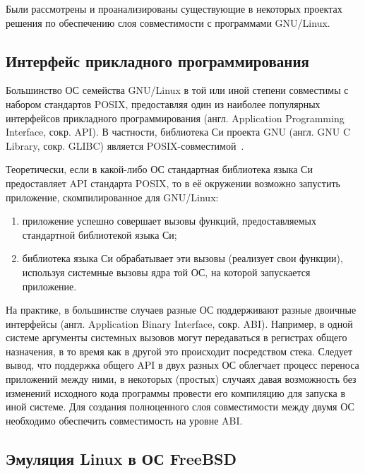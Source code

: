 
\label{sec:relatedworks}

Были рассмотрены и проанализированы существующие в некоторых проектах решения по обеспечению слоя совместимости с программами GNU/Linux.

\subsection{Интерфейс прикладного программирования}

Большинство ОС семейства GNU/Linux в той или иной степени совместимы с набором стандартов POSIX, предоставляя один из наиболее популярных интерфейсов прикладного программирования (англ. Application Programming Interface, сокр. API). В частности, библиотека Си проекта GNU (англ. GNU C Library, сокр. GLIBC) является POSIX-совместимой~\cite{glibc-man}.

Теоретически, если в какой-либо ОС стандартная библиотека языка Си предоставляет API стандарта POSIX, то в её окружении возможно запустить приложение, скомпилированное для GNU/Linux:
\begin{enumerate}
    \item приложение успешно совершает вызовы функций, предоставляемых стандартной библиотекой языка Си;
    \item библиотека языка Си обрабатывает эти вызовы (реализует свои функции), используя системные вызовы ядра той ОС, на которой запускается приложение.~\cite[с.~96]{book:linux-kernel-development}
\end{enumerate}

На практике, в большинстве случаев разные ОС поддерживают разные двоичные интерфейсы (англ. Application Binary Interface, сокр. ABI). Например, в одной системе аргументы системных вызовов могут передаваться в регистрах общего назначения, в то время как в другой это происходит посредством стека. Следует вывод, что поддержка общего API в двух разных ОС облегчает процесс переноса приложений между ними, в некоторых (простых) случаях давая возможность без изменений исходного кода программы провести его компиляцию для запуска в иной системе. Для создания полноценного слоя совместимости между двумя ОС необходимо обеспечить совместимость на уровне ABI.


\subsection{Эмуляция Linux в ОС FreeBSD}

